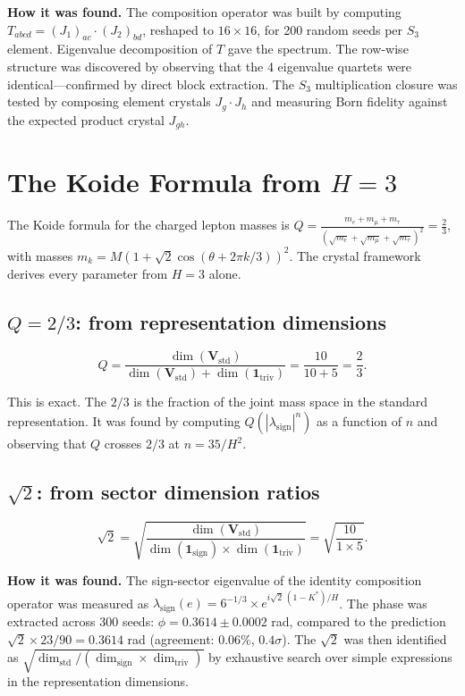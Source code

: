 \documentclass[11pt,a4paper]{article}
\theoremstyle{definition}
\theoremstyle{remark}
\begin{document}
\textbf{How it was found.} The composition operator was built by computing $T_{abcd} = (J_1)_{ac} \cdot (J_2)_{bd}$, reshaped to $16 \times 16$, for 200 random seeds per $S_3$ element. Eigenvalue decomposition of $T$ gave the spectrum. The row-wise structure was discovered by observing that the 4 eigenvalue quartets were identical---confirmed by direct block extraction. The $S_3$ multiplication closure was tested by composing element crystals $J_g \cdot J_h$ and measuring Born fidelity against the expected product crystal $J_{gh}$.


\section{The Koide Formula from $H=3$}\label{sec:koide}

The Koide formula for the charged lepton masses is $Q = \frac{m_e + m_\mu + m_\tau}{(\sqrt{m_e} + \sqrt{m_\mu} + \sqrt{m_\tau})^2} = \frac{2}{3}$, with masses $m_k = M(1 + \sqrt{2}\cos(\theta + 2\pi k/3))^2$. The crystal framework derives every parameter from $H=3$ alone.

\subsection{$Q = 2/3$: from representation dimensions}

\begin{equation}
Q = \frac{\dim(\mathbf{V}_{\mathrm{std}})}{\dim(\mathbf{V}_{\mathrm{std}}) + \dim(\mathbf{1}_{\mathrm{triv}})} = \frac{10}{10 + 5} = \frac{2}{3}.
\end{equation}

This is exact. The $2/3$ is the fraction of the joint mass space in the standard representation. It was found by computing $Q(|\lambda_{\mathrm{sign}}|^n)$ as a function of $n$ and observing that $Q$ crosses $2/3$ at $n = 35/H^2$.

\subsection{$\sqrt{2}$: from sector dimension ratios}

\begin{equation}
\sqrt{2} = \sqrt{\frac{\dim(\mathbf{V}_{\mathrm{std}})}{\dim(\mathbf{1}_{\mathrm{sign}}) \times \dim(\mathbf{1}_{\mathrm{triv}})}} = \sqrt{\frac{10}{1 \times 5}}.
\end{equation}

\textbf{How it was found.} The sign-sector eigenvalue of the identity composition operator was measured as $\lambda_{\mathrm{sign}}(e) = 6^{-1/3} \times e^{i\sqrt{2}\,(1-K^*)/H}$. The phase was extracted across 300 seeds: $\phi = 0.3614 \pm 0.0002$ rad, compared to the prediction $\sqrt{2} \times 23/90 = 0.3614$ rad (agreement: $0.06\%$, $0.4\sigma$). The $\sqrt{2}$ was then identified as $\sqrt{\dim_{\mathrm{std}}/(\dim_{\mathrm{sign}} \times \dim_{\mathrm{triv}})}$ by exhaustive search over simple expressions in the representation dimensions.
\end{document}
